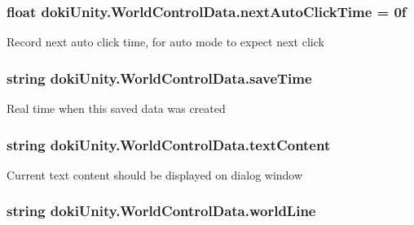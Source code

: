 \subsubsection[{\texorpdfstring{next\+Auto\+Click\+Time}{nextAutoClickTime}}]{\setlength{\rightskip}{0pt plus 5cm}float doki\+Unity.\+World\+Control\+Data.\+next\+Auto\+Click\+Time = 0f}\hypertarget{classdoki_unity_1_1_world_control_data_a562371219297ea2089b6a85ba35cb08e}{}\label{classdoki_unity_1_1_world_control_data_a562371219297ea2089b6a85ba35cb08e}


Record next auto click time, for auto mode to expect next click 

\subsubsection[{\texorpdfstring{save\+Time}{saveTime}}]{\setlength{\rightskip}{0pt plus 5cm}string doki\+Unity.\+World\+Control\+Data.\+save\+Time}\hypertarget{classdoki_unity_1_1_world_control_data_af4ea7ace0548e2004bf9fa89f9a480a2}{}\label{classdoki_unity_1_1_world_control_data_af4ea7ace0548e2004bf9fa89f9a480a2}


Real time when this saved data was created 

\subsubsection[{\texorpdfstring{text\+Content}{textContent}}]{\setlength{\rightskip}{0pt plus 5cm}string doki\+Unity.\+World\+Control\+Data.\+text\+Content}\hypertarget{classdoki_unity_1_1_world_control_data_af3e5da1c0bf42d6f3a3b8fdf25380479}{}\label{classdoki_unity_1_1_world_control_data_af3e5da1c0bf42d6f3a3b8fdf25380479}


Current text content should be displayed on dialog window 

\subsubsection[{\texorpdfstring{world\+Line}{worldLine}}]{\setlength{\rightskip}{0pt plus 5cm}string doki\+Unity.\+World\+Control\+Data.\+world\+Line}\hypertarget{classdoki_unity_1_1_world_control_data_aa5f6043ea14303922a5f10e787af2786}{}\label{classdoki_unity_1_1_world_control_data_aa5f6043ea14303922a5f10e787af2786}


